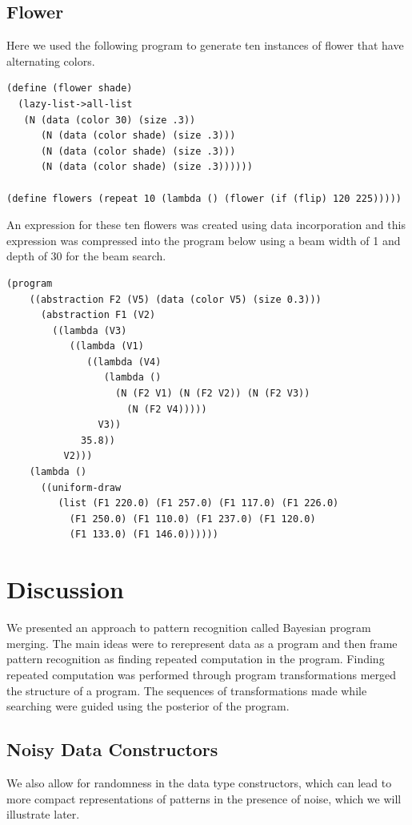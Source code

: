 \documentclass[a4paper,10pt]{article}
\begin{document}
\subsection{Flower}
Here we used the following program to generate ten instances of flower that have alternating colors.  
\begin{lstlisting}
(define (flower shade)
  (lazy-list->all-list
   (N (data (color 30) (size .3))
      (N (data (color shade) (size .3)))
      (N (data (color shade) (size .3)))
      (N (data (color shade) (size .3))))))

(define flowers (repeat 10 (lambda () (flower (if (flip) 120 225)))))
\end{lstlisting}
An expression for these ten flowers was created using data incorporation and this expression was compressed into the program below using a beam width of 1 and depth of 30 for the beam search.
\begin{lstlisting}
(program
    ((abstraction F2 (V5) (data (color V5) (size 0.3)))
      (abstraction F1 (V2)
        ((lambda (V3)
           ((lambda (V1)
              ((lambda (V4)
                 (lambda ()
                   (N (F2 V1) (N (F2 V2)) (N (F2 V3))
                     (N (F2 V4)))))
                V3))
             35.8))
          V2)))
    (lambda ()
      ((uniform-draw
         (list (F1 220.0) (F1 257.0) (F1 117.0) (F1 226.0)
           (F1 250.0) (F1 110.0) (F1 237.0) (F1 120.0)
           (F1 133.0) (F1 146.0))))))
\end{lstlisting}

\section{Discussion}
We presented an approach to pattern recognition called Bayesian program merging.  The main ideas were to rerepresent data as a program and then frame pattern recognition as finding repeated computation in the program.   Finding repeated computation was performed through program transformations merged the structure of a program.  The sequences of transformations made while searching were guided using the posterior of the program.  

\subsection{Noisy Data Constructors}
We also allow for randomness in the data type constructors, which can lead to more compact representations of patterns in the presence of noise, which we will illustrate later.
\end{document}
